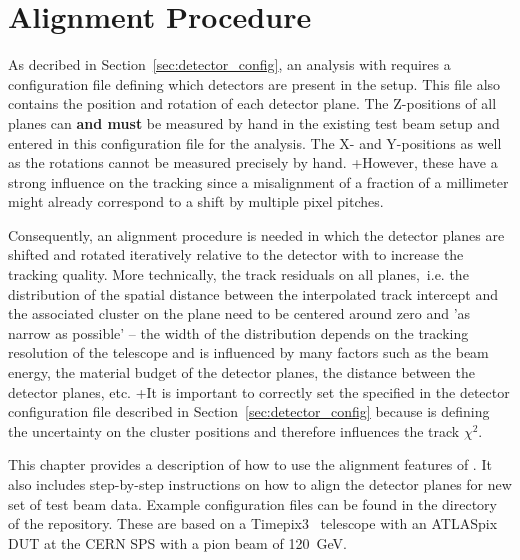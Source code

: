 \chapter{Alignment Procedure}
\label{ch:howtoalign}

As decribed in Section~\ref{sec:detector_config}, an analysis with \corry requires a configuration file defining which detectors are present in the setup.
This file also contains the position and rotation of each detector plane.
The Z-positions of all planes can \textbf{and must} be measured by hand in the existing test beam setup and entered in this configuration file for the analysis.
The X- and Y-positions as well as the rotations cannot be measured precisely by hand.
+However, these have a strong influence on the tracking since a misalignment of a fraction of a millimeter might already correspond to a shift by multiple pixel pitches.

Consequently, an alignment procedure is needed in which the detector planes are shifted and rotated iteratively relative to the detector with  to increase the tracking quality.
More technically, the track residuals on all planes,~i.e. the distribution of the spatial distance between the interpolated track intercept and the associated cluster on the plane need to be centered around zero and 'as narrow as possible' -- the width of the distribution depends on the tracking resolution of the telescope and is influenced by many factors such as the beam energy, the material budget of the detector planes, the distance between the detector planes, etc.
+It is important to correctly set the  specified in the detector configuration file described in Section~\ref{sec:detector_config} because is defining the uncertainty on the cluster positions and therefore influences the track $\chi^2$.

This chapter provides a description of how to use the alignment features of \corry.
It also includes step-by-step instructions on how to align the detector planes for new set of test beam data.
Example configuration files can be found in the  directory of the repository.
These are based on a Timepix3~\cite{timepix3} telescope with an ATLASpix~\cite{atlaspix} DUT at the CERN SPS with a pion beam of \SI{120}{GeV}.

